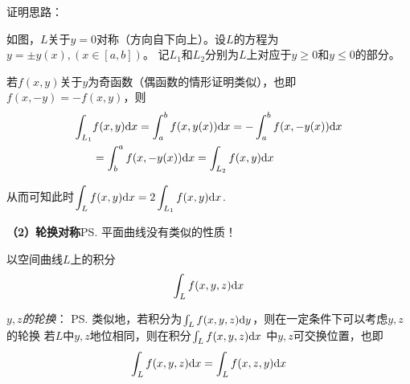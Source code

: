 \begin{shaded}
	证明思路：
	
	\begin{center}
	\end{center}
	如图，$L$关于$y=0$对称（方向自下向上）。设$L$的方程为$y=\pm y(x),(x\in[a,b])$。
	记$L_1$和$L_2$分别为$L$上对应于$y\geq0$和$y\leq0$的部分。
	
	若$f(x,y)$关于$y$为奇函数（偶函数的情形证明类似），也即$f(x,-y)=-f(x,y)$，则
	\begin{align*}
		\displaystyle\int_{L_1}&f(x,y)\mathrm{d} x
		=\displaystyle\int_{a}^{b}f(x,y(x))\mathrm{d} x
		=-\displaystyle\int_{a}^{b}f(x,-y(x))\mathrm{d} x\\
		&=\displaystyle\int_{b}^{a}f(x,-y(x))\mathrm{d} x
		=\displaystyle\int_{L_2}f(x,y)\mathrm{d} x
	\end{align*}
	
	从而可知此时$\displaystyle\int_{L}f(x,y)\mathrm{d} x=2\displaystyle\int_{L_1}f(x,y)\mathrm{d} x$.
\end{shaded}

{\bf （2）轮换对称}\ps{\color{red}平面曲线没有类似的性质！}

以空间曲线$L$上的积分
$$\int_Lf(x,y,z)\mathrm{d} x$$

{\it\color{red} $y,z$的轮换}：
\ps{类似地，若积分为$\int_Lf(x,y,z)\mathrm{d} y$，则在一定条件下可以考虑$y,z$的轮换}
{\color{red} 若$L$中$y,z$地位相同，则在积分$\int_Lf(x,y,z)\mathrm{d} x$
中$y,z$可交换位置}，也即
$$\int_Lf(x,y,z)\mathrm{d} x=\int_Lf(x,z,y)\mathrm{d} x$$

